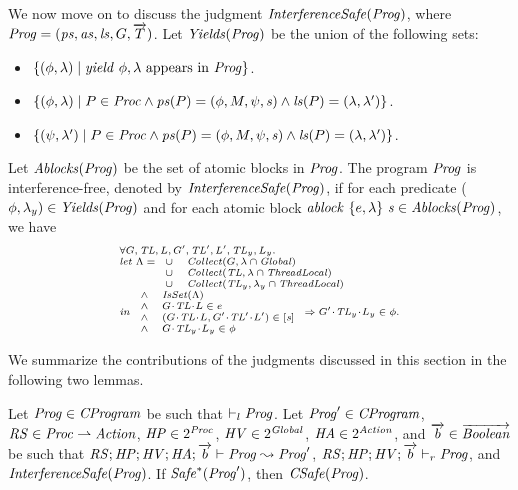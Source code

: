 We now move on to discuss the judgment $\mathit{InterferenceSafe}(\mathit{Prog})$,
where $\mathit{Prog} = (\mathit{ps}, \mathit{as}, \mathit{ls}, G, \overrightarrow{T})$. 
Let $\mathit{Yields}(\mathit{Prog})$ be the union of the following sets:
\begin{itemize}
\item
$\{(\phi,\lambda) \mid \mathit{yield}\ \phi,\lambda~\mathrm{appears~in~\mathit{Prog}}\}$.
\item
$\{(\phi,\lambda) \mid P \in \mathit{Proc} \wedge \mathit{ps}(P) = (\phi, M, \psi, \mathit{s}) \wedge \mathit{ls}(P) = (\lambda,\lambda')\}$.
\item
$\{(\psi,\lambda') \mid P \in \mathit{Proc} \wedge \mathit{ps}(P) = (\phi, M, \psi, \mathit{s}) \wedge \mathit{ls}(P) = (\lambda,\lambda')\}$.
\end{itemize}
Let $\mathit{Ablocks}(\mathit{Prog})$ be the set of atomic blocks in $\mathit{Prog}$.
The program $\mathit{Prog}$ is interference-free, denoted by $\mathit{InterferenceSafe}(\mathit{Prog})$,
if for each predicate ($\phi,\lambda_y) \in \mathit{Yields}(\mathit{Prog})$ and 
for each atomic block $\mathit{ablock}\ {\{e,\lambda\}}\ {\mathit{s}} \in \mathit{Ablocks}(\mathit{Prog})$, we have
\[
\scriptsize{
\begin{array}{l}
\forall \varsG,\varsTL,\varsL,\varsG',\varsTL',\varsL',\varsTL_y,\varsL_y.\\ 
\mathit{let}\ \Lambda =
\begin{array}[t]{ll}
\cup & \Collect(\varsG, \lins \cap \Global) \\
\cup & \Collect(\varsTL, \lins \cap \ThreadLocal) \\
\cup & \Collect(\varsTL_y, \lins_y \cap \ThreadLocal) 
\end{array} \\
\mathit{in}\
\begin{array}{ll}
\wedge & \IsSet(\Lambda) \\
\wedge & \MakeStore{\varsG}{\varsTL}{\varsL} \in e \\
\wedge & (\MakeStore{\varsG}{\varsTL}{\varsL}, \MakeStore{\varsG'}{\varsTL'}{\varsL'}) \in \trel{\stmt} \\
\wedge & \MakeStore{\varsG}{\varsTL_y}{\varsL_y} \in \phi
\end{array}
\Rightarrow \MakeStore{\varsG'}{\varsTL_y}{\varsL_y} \in \phi.
\end{array}
}
\]

We summarize the contributions of the judgments discussed in this section in the following two lemmas.
\begin{lemma}
Let $\mathit{Prog} \in \mathit{CProgram}$ be such that $\vdash_l \mathit{Prog}$.
Let $\mathit{Prog}' \in \mathit{CProgram}$, $\mathit{RS} \in \mathit{Proc} \rightharpoonup \mathit{Action}$, $\mathit{HP} \in 2^{\mathit{Proc}}$, $\mathit{HV} \in 2^{\mathit{Global}}$, $\mathit{HA} \in 2^{\mathit{Action}}$,
and $\overrightarrow{b} \in \overrightarrow{\mathit{Boolean}}$ be such that 
$\mathit{RS};\mathit{HP};\mathit{HV};\mathit{HA};\overrightarrow{b} \vdash \mathit{Prog} \leadsto \mathit{Prog}'$, $\mathit{RS};\mathit{HP};\mathit{HV};\overrightarrow{b} \vdash_r \mathit{Prog}$, and
$\mathit{InterferenceSafe}(\mathit{Prog})$.
If $\mathit{Safe}^*(\mathit{Prog}')$, then $\mathit{CSafe}(\mathit{Prog})$.
\end{lemma}

